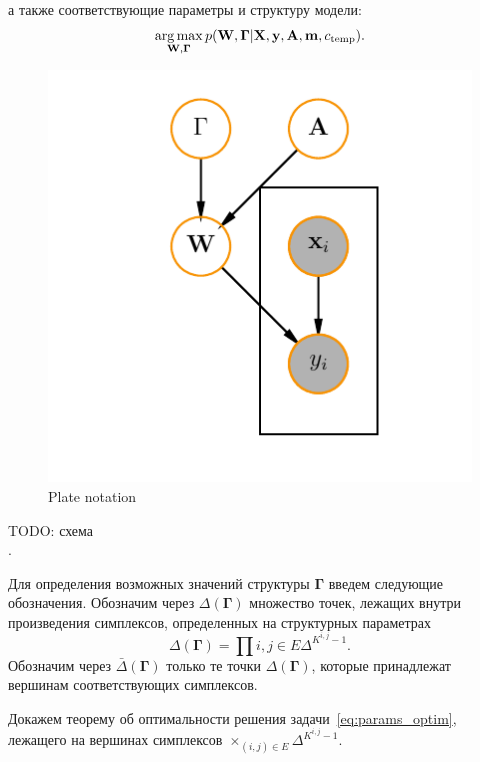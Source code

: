 а также соответствующие параметры и структуру модели:
\begin{equation}
\label{eq:params_optim}
    \operatorname*{arg\,max}_{\mathbf{W}, \boldsymbol{\Gamma}}  p(\mathbf{W}, \boldsymbol{\Gamma}|\mathbf{X},\mathbf{y}, \mathbf{A}, \mathbf{m}, {c_\text{temp}}).
\end{equation}

 \begin{figure}[H]
\includegraphics[width=\textwidth]{./plots/notebooks/plate.pdf}
\caption{Plate notation}
\end{figure}

TODO: схема\\.


Для определения возможных значений структуры $\boldsymbol{\Gamma}$ введем следующие обозначения.
Обозначим через $\Delta(\boldsymbol{\Gamma})$ множество точек, лежащих внутри произведения симплексов, определенных на структурных параметрах
$$
\Delta(\boldsymbol{\Gamma}) =  \prod{i,j \in E}\Delta^{K^{i,j}-1}.
$$
Обозначим через $\bar{\Delta}(\boldsymbol{\Gamma})$ только те точки $\Delta(\boldsymbol{\Gamma})$, которые принадлежат вершинам соответствующих симплексов.


Докажем теорему об оптимальности решения задачи~\eqref{eq:params_optim}, лежащего на вершинах симплексов $\times_{(i,j) \in E} \Delta^{K^{i,j}-1}$. 


